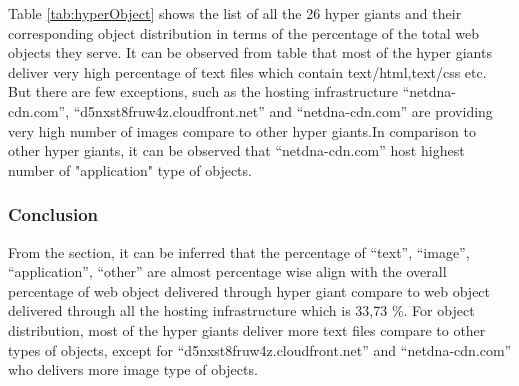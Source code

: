 \noindent Table \ref{tab:hyperObject} shows the list of all the 26 hyper giants and their corresponding object distribution in terms of the percentage of the total web objects they serve. It can be observed from table that most of the hyper giants deliver very high percentage of text files which contain text/html,text/css etc. But there are few exceptions, such as the hosting infrastructure \enquote{netdna-cdn.com}, \enquote{d5nxst8fruw4z.cloudfront.net} and \enquote{netdna-cdn.com} are providing very high number of images compare to other hyper giants.In comparison to other hyper giants, it can be observed that \enquote{netdna-cdn.com} host highest number of "application" type of objects.\\

 \subsubsection{Conclusion}
\noindent From the section, it can be inferred that the percentage of \enquote{text}, \enquote{image}, \enquote{application}, \enquote{other} are almost percentage wise align with the overall percentage of web object delivered through hyper giant compare to web object delivered through all the hosting infrastructure which is 33,73 \%. For object distribution, most of the hyper giants deliver more text files compare to other types of objects, except for \enquote{d5nxst8fruw4z.cloudfront.net} and \enquote{netdna-cdn.com} who delivers more image type of objects.
\clearpage